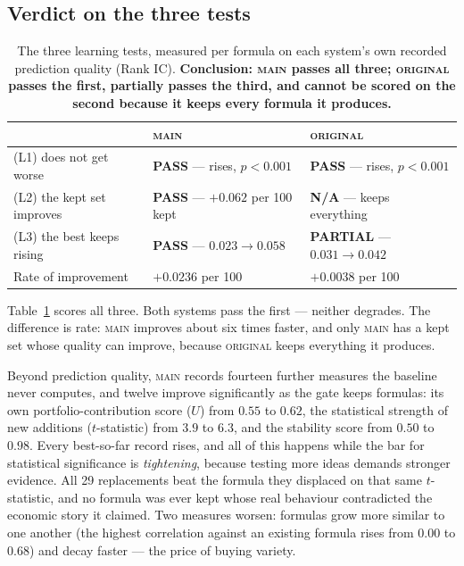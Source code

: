 \documentclass[11pt]{article}
\newcommand{\main}{\textsc{main}}
\newcommand{\orig}{\textsc{original}}
\begin{document}
\subsection{Verdict on the three tests}

\begin{table}[h]
\centering\small
\begin{tabular}{lll}
\toprule
& \main{} & \orig{} \\
\midrule
(L1) does not get worse & \textbf{PASS} --- rises, $p{<}0.001$ & \textbf{PASS} --- rises, $p{<}0.001$ \\
(L2) the kept set improves & \textbf{PASS} --- $+0.062$ per 100 kept & \textbf{N/A} --- keeps everything \\
(L3) the best keeps rising & \textbf{PASS} --- $0.023 \to 0.058$ & \textbf{PARTIAL} --- $0.031 \to 0.042$ \\
\midrule
Rate of improvement & $\bm{+0.0236}$ per 100 & $+0.0038$ per 100 \\
\bottomrule
\end{tabular}
\caption{The three learning tests, measured per formula on each system's own recorded
prediction quality (Rank IC). \textbf{Conclusion: \main{} passes all three; \orig{}
passes the first, partially passes the third, and cannot be scored on the second
because it keeps every formula it produces.}}
\label{tab:learning-verdict}
\end{table}

\noindent Table~\ref{tab:learning-verdict} scores all three. Both systems pass the
first --- neither degrades. The difference is rate: \main{} improves about six times
faster, and only \main{} has a kept set whose quality can improve, because \orig{}
keeps everything it produces.

Beyond prediction quality, \main{} records fourteen further measures the baseline
never computes, and twelve improve significantly as the gate keeps formulas: its own
portfolio-contribution score ($U$) from $0.55$ to $0.62$, the statistical strength of
new additions ($t$-statistic) from $3.9$ to $6.3$, and the stability score from $0.50$
to $0.98$. Every best-so-far record rises, and all of this happens while the bar for
statistical significance is \emph{tightening}, because testing more ideas demands
stronger evidence. All 29 replacements beat the formula they displaced on that same
$t$-statistic, and no formula was ever kept whose real behaviour contradicted the
economic story it claimed. Two measures worsen: formulas grow more similar to one
another (the highest correlation against an existing formula rises from $0.00$ to
$0.68$) and decay faster --- the price of buying variety.
\end{document}
